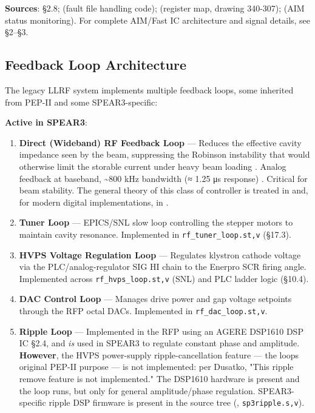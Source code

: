 \begin{keynote}
\textbf{Sources}:  §2.8;  (fault file handling code);  (register map, drawing 340-307);  (AIM status monitoring). For complete AIM/Fast IC architecture and signal details, see  §2--§3.
\end{keynote}

\subsection{Feedback Loop Architecture}

The legacy LLRF system implements multiple feedback loops, some inherited from PEP-II and some SPEAR3-specific:

\textbf{Active in SPEAR3}:

\begin{enumerate}
\def\labelenumi{\arabic{enumi}.}
\tightlist
\item
  \textbf{Direct (Wideband) RF Feedback Loop} --- Reduces the effective cavity impedance seen by the beam, suppressing the Robinson instability  that would otherwise limit the storable current under heavy beam loading . Analog feedback at baseband, \textasciitilde800 kHz bandwidth (≈ 1.25 μs response) . Critical for beam stability. The general theory of this class of controller is treated in  and, for modern digital implementations, in .
\item
  \textbf{Tuner Loop} --- EPICS/SNL slow loop controlling the stepper motors to maintain cavity resonance. Implemented in \texttt{rf\_tuner\_loop.st,v} (§17.3).
\item
  \textbf{HVPS Voltage Regulation Loop} --- Regulates klystron cathode voltage via the PLC/analog-regulator SIG HI chain to the Enerpro SCR firing angle. Implemented across \texttt{rf\_hvps\_loop.st,v} (SNL) and PLC ladder logic (§10.4).
\item
  \textbf{DAC Control Loop} --- Manages drive power and gap voltage setpoints through the RFP octal DACs. Implemented in \texttt{rf\_dac\_loop.st,v}.
\item
  \textbf{Ripple Loop} --- Implemented in the RFP using an AGERE DSP1610 DSP IC  §2.4, and \emph{is} used in SPEAR3 to regulate constant phase and amplitude. \textbf{However}, the HVPS power-supply ripple-cancellation feature --- the loop\textquotesingle s original PEP-II purpose --- is not implemented: per Dusatko, "This ripple remove feature is not implemented." The DSP1610 hardware is present and the loop runs, but only for general amplitude/phase regulation. SPEAR3-specific ripple DSP firmware is present in the source tree (, \texttt{sp3ripple.s,v}).
\end{enumerate}

